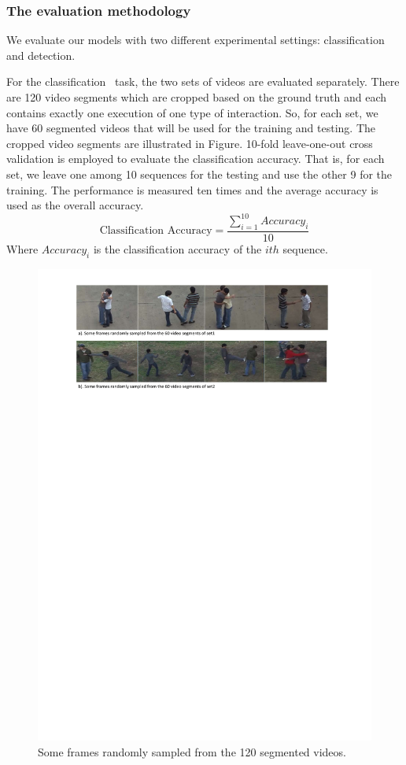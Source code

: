 \subsubsection*{The evaluation methodology}
We evaluate our models with two different experimental settings: classification and detection. 
\par 
For the \textquotesingle classification \textquotesingle \ task, the two sets of videos are evaluated separately. There are 120 video segments which are cropped based on the ground truth and each contains exactly one execution of one type of interaction. So, for each set, we have 60 segmented videos that will be used for the training and testing. The cropped video segments are illustrated in Figure.  10-fold leave-one-out cross validation is employed to evaluate the classification accuracy. That is, for each set, we leave one among 10 sequences for the testing and use the other 9 for the training. The performance is measured ten times and the average accuracy is used as the overall accuracy. 
\begin{equation*}
\text{Classification Accuracy} = \frac{\sum_{i=1}^{10} Accuracy_i }{10}
\end{equation*}
Where \(Accuracy_i\) is the classification accuracy of the \(ith\) sequence.
\begin{figure}
	\includegraphics[trim=2cm 22cm 0cm 1cm]{figs/ut_segments.pdf}
	\caption{Some frames randomly sampled from the 120 segmented videos. }
	\label{fig:ut_segments}
\end{figure}
